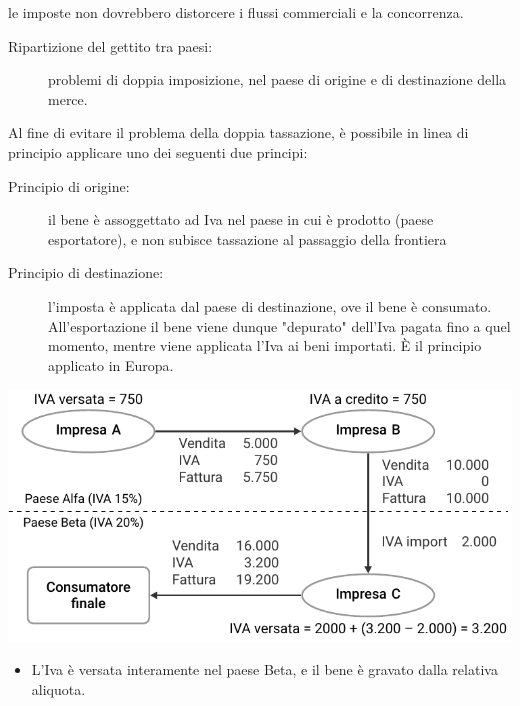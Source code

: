 \documentclass[11pt,italian]{beamer}
\begin{document}
\begin{frame} le imposte non dovrebbero distorcere
i flussi commerciali e la concorrenza.
\begin{description}
\item[{Ripartizione del gettito tra paesi:}] problemi di doppia
imposizione, nel paese di origine e di destinazione della merce.
\end{description}

Al fine di evitare il problema della doppia tassazione, è possibile
in linea di principio applicare uno dei seguenti due principi:
\begin{description}
\item[{Principio di origine:}] il bene è assoggettato ad Iva nel paese in cui è
prodotto (paese esportatore), e non subisce tassazione al passaggio della
frontiera
\item[{Principio di destinazione:}] l'imposta è applicata dal paese di
destinazione, ove il bene è consumato.  All'esportazione il bene viene
dunque "depurato" dell'Iva pagata fino a quel momento, mentre viene
applicata l'Iva ai beni importati.  È il principio applicato in Europa.
\end{description}
\end{frame}

\begin{frame}
\centering
\begin{center}
\includegraphics[width=.9\textwidth]{./figure/IVA-destinazione.pdf}
\end{center}

\begin{itemize}
\item L'Iva è versata interamente nel paese Beta, e il bene è gravato dalla
relativa aliquota.
\end{itemize}
\end{frame}
\end{document}
